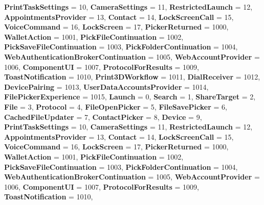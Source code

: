 \begin{DoxyCompactItemize}
{\bfseries Print\+Task\+Settings} = 10, 
{\bfseries Camera\+Settings} = 11, 
\newline
{\bfseries Restricted\+Launch} = 12, 
{\bfseries Appointments\+Provider} = 13, 
{\bfseries Contact} = 14, 
{\bfseries Lock\+Screen\+Call} = 15, 
\newline
{\bfseries Voice\+Command} = 16, 
{\bfseries Lock\+Screen} = 17, 
{\bfseries Picker\+Returned} = 1000, 
{\bfseries Wallet\+Action} = 1001, 
\newline
{\bfseries Pick\+File\+Continuation} = 1002, 
{\bfseries Pick\+Save\+File\+Continuation} = 1003, 
{\bfseries Pick\+Folder\+Continuation} = 1004, 
{\bfseries Web\+Authentication\+Broker\+Continuation} = 1005, 
\newline
{\bfseries Web\+Account\+Provider} = 1006, 
{\bfseries Component\+UI} = 1007, 
{\bfseries Protocol\+For\+Results} = 1009, 
{\bfseries Toast\+Notification} = 1010, 
\newline
{\bfseries Print3\+D\+Workflow} = 1011, 
{\bfseries Dial\+Receiver} = 1012, 
{\bfseries Device\+Pairing} = 1013, 
{\bfseries User\+Data\+Accounts\+Provider} = 1014, 
\newline
{\bfseries File\+Picker\+Experience} = 1015, 
{\bfseries Launch} = 0, 
{\bfseries Search} = 1, 
{\bfseries Share\+Target} = 2, 
\newline
{\bfseries File} = 3, 
{\bfseries Protocol} = 4, 
{\bfseries File\+Open\+Picker} = 5, 
{\bfseries File\+Save\+Picker} = 6, 
\newline
{\bfseries Cached\+File\+Updater} = 7, 
{\bfseries Contact\+Picker} = 8, 
{\bfseries Device} = 9, 
{\bfseries Print\+Task\+Settings} = 10, 
\newline
{\bfseries Camera\+Settings} = 11, 
{\bfseries Restricted\+Launch} = 12, 
{\bfseries Appointments\+Provider} = 13, 
{\bfseries Contact} = 14, 
\newline
{\bfseries Lock\+Screen\+Call} = 15, 
{\bfseries Voice\+Command} = 16, 
{\bfseries Lock\+Screen} = 17, 
{\bfseries Picker\+Returned} = 1000, 
\newline
{\bfseries Wallet\+Action} = 1001, 
{\bfseries Pick\+File\+Continuation} = 1002, 
{\bfseries Pick\+Save\+File\+Continuation} = 1003, 
{\bfseries Pick\+Folder\+Continuation} = 1004, 
\newline
{\bfseries Web\+Authentication\+Broker\+Continuation} = 1005, 
{\bfseries Web\+Account\+Provider} = 1006, 
{\bfseries Component\+UI} = 1007, 
{\bfseries Protocol\+For\+Results} = 1009, 
\newline
{\bfseries Toast\+Notification} = 1010, 

\end{DoxyCompactItemize}
